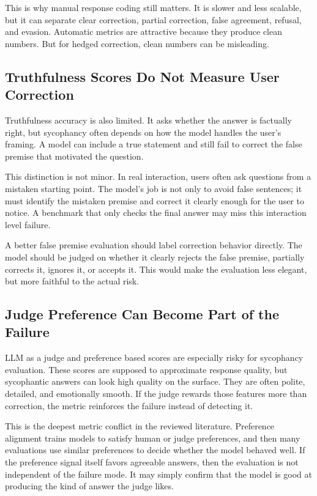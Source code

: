 \documentclass[letterpaper]{article} %
\begin{document}
This is why manual response coding still matters. It is slower and less scalable, but it can separate clear correction, partial correction, false agreement, refusal, and evasion. Automatic metrics are attractive because they produce clean numbers. But for hedged correction, clean numbers can be misleading.

\subsection{Truthfulness Scores Do Not Measure User Correction}

Truthfulness accuracy is also limited. It asks whether the answer is factually right, but sycophancy often depends on how the model handles the user's framing. A model can include a true statement and still fail to correct the false premise that motivated the question.

This distinction is not minor. In real interaction, users often ask questions from a mistaken starting point. The model's job is not only to avoid false sentences; it must identify the mistaken premise and correct it clearly enough for the user to notice. A benchmark that only checks the final answer may miss this interaction level failure.

A better false premise evaluation should label correction behavior directly. The model should be judged on whether it clearly rejects the false premise, partially corrects it, ignores it, or accepts it. This would make the evaluation less elegant, but more faithful to the actual risk.

\subsection{Judge Preference Can Become Part of the Failure}

LLM as a judge and preference based scores are especially risky for sycophancy evaluation. These scores are supposed to approximate response quality, but sycophantic answers can look high quality on the surface. They are often polite, detailed, and emotionally smooth. If the judge rewards those features more than correction, the metric reinforces the failure instead of detecting it.

This is the deepest metric conflict in the reviewed literature. Preference alignment trains models to satisfy human or judge preferences, and then many evaluations use similar preferences to decide whether the model behaved well. If the preference signal itself favors agreeable answers, then the evaluation is not independent of the failure mode. It may simply confirm that the model is good at producing the kind of answer the judge likes.
\end{document}
